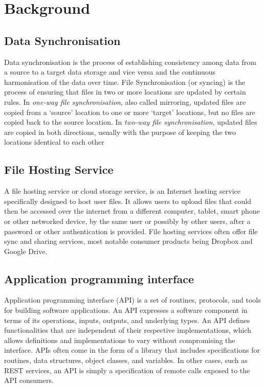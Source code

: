 
\chapter{Background}

\section{Data Synchronisation}
  Data synchronisation is the process of establishing consistency among data from a source to a target data storage and vice versa and the continuous harmonisation of the data over time.
  File Synchronisation (or syncing) is the process of ensuring that files in two or more locations are updated by certain rules. In \emph{one-way file synchronisation}, also called mirroring, updated files are copied from a `source' location to one or more `target' locations, but no files are copied back to the source location. In \emph{two-way file synchronisation}, updated files are copied in both directions, usually with the purpose of keeping the two locations identical to each other


\section{File Hosting Service}
  A file hosting service\cite{wiki-file-hosting} or cloud storage service, is an Internet hosting service specifically designed to host user files. It allows users to upload files that could then be accessed over the internet from a different computer, tablet, smart phone or other networked device, by the same user or possibly by other users, after a password or other authentication is provided. File hosting services often offer file sync and sharing services, most notable consumer products being Dropbox and Google Drive.


\section{Application programming interface}
  Application programming interface (API) is a set of routines, protocols, and tools for building software applications. An API expresses a software component in terms of its operations, inputs, outputs, and underlying types. An API defines functionalities that are independent of their respective implementations, which allows definitions and implementations to vary without compromising the interface. APIs often come in the form of a library that includes specifications for routines, data structures, object classes, and variables. In other cases, such as REST services, an API is simply a specification of remote calls exposed to the API consumers.

